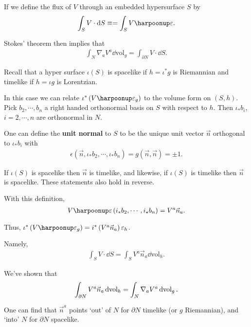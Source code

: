 If we define the flux of $V$ through an embedded hypersurface $S$ by
\begin{align}
    \int_S V \cdot \dd{S} \equiv = \int_S V \hook \epsilon
.\end{align}

Stokes' theorem then implies that
\begin{align}
    \int_{N} \nabla_a V^{a} \dd{\text{vol}}_g = \int_{\partial N} V \cdot \dd{S}
.\end{align}

Recall that a hyper surface $\iota \left( S \right) $ is spacelike if $h = \iota^{*} g$ is Riemannian and timelike if $h = \iota g$ is Lorentzian.

In this case we can relate $\iota^{*}\left( V \hook \epsilon_g \right) $ to the volume form on $\left( S,h \right) $. Pick $b_2, \cdots, b_{n}$ a right handed orthonormal basis on $S$ with respect to $h$. Then $\iota_* b_i$, $i=2,\cdots,n$ are orthonormal in $N$. 

One can define the \textbf{unit normal} to $S$ to be the unique unit vector $\vec{n}$ orthogonal to $\iota_* b_i$ with
\begin{align}
    \epsilon \left( \vec{n}, \iota_* b_2, \cdots, \iota_* b_n \right) = g\left( \vec{n}, \vec{n} \right) = \pm 1
.\end{align}

If $\iota \left( S \right) $ is spacelike then $\vec{n}$ is timelike, and likewise, if $\iota \left( S \right) $ is timelike then $\vec{n}$ is spacelike. These statements also hold in reverse.

With this definition,
\begin{align}
    V \hook \epsilon \left( i_{*}b_2, \cdots, i_\star b_n \right) = V^{a} \vec{n}_a
.\end{align}

Thus, $\iota^{*} \left( V \hook \epsilon_g \right) = i^{*} \left( V^{a} \vec{n}_a \right) \epsilon_h$.

Namely,
\begin{align}
    \int_S V \cdot \dd{S} = \int_S V^{a} \vec{n}_a \dd{\text{vol}}_h
.\end{align}

We've shown that
\begin{align}
    \int_{\partial N} V^{a} \vec{n}_a \dd{\text{vol}}_h = \int_N \nabla_a V^{a} \dd{\text{vol}}_g
.\end{align}

One can find that $\vec{n}^{a}$ points `out' of $N$ for $\partial N$ timelike (or $g$ Riemannian), and `into' $N$ for $\partial N$ spacelike.

